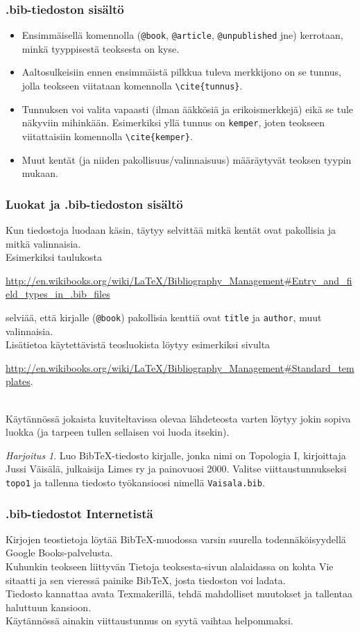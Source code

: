 \documentclass[handout]{beamer}
\theoremstyle{remark}
\newtheorem{harj}{Harjoitus}[section]
\newcommand{\vaihto}{\\ \vspace{10pt}}
\newcommand{\BibTeX}{BibTeX}
\begin{document}
\begin{frame}[fragile]
\frametitle{.bib-tiedoston sisältö}
\begin{itemize}
\item Ensimmäisellä komennolla (\verb-@book-, \verb-@article-, \verb-@unpublished- jne) kerrotaan, minkä tyyppisestä teoksesta on kyse. 
\item Aaltosulkeisiin ennen ensimmäistä pilkkua tuleva merkkijono on se tunnus, jolla teokseen viitataan komennolla \verb-\cite{tunnus}-. 
\item Tunnuksen voi valita vapaasti (ilman ääkkösiä ja erikoismerkkejä) eikä se tule näkyviin mihinkään.  Esimerkiksi yllä tunnus on \verb-kemper-, joten teokseen viitattaisiin komennolla \verb-\cite{kemper}-.
\item Muut kentät (ja niiden pakollisuus/valinnaisuus) määräytyvät teoksen tyypin mukaan.
\end{itemize}
\end{frame}
\begin{frame}[fragile]
\frametitle{Luokat ja .bib-tiedoston sisältö}
Kun tiedostoja luodaan käsin, täytyy selvittää mitkä kentät ovat pakollisia ja mitkä valinnaisia. 
\vaihto
Esimerkiksi taulukosta 
\begin{scriptsize}
\url{http://en.wikibooks.org/wiki/LaTeX/Bibliography_Management#Entry_and_field_types_in_.bib_files}
\end{scriptsize}
selviää, että kirjalle (\verb-@book-) pakollisia kenttiä ovat \verb-title- ja \verb-author-, muut valinnaisia.
\vaihto
Lisätietoa käytettävistä teosluokista löytyy esimerkiksi sivulta
\begin{scriptsize}
\url{http://en.wikibooks.org/wiki/LaTeX/Bibliography_Management#Standard_templates}.
\end{scriptsize}
\vaihto
Käytännössä jokaista kuviteltavissa olevaa lähdeteosta varten löytyy jokin sopiva luokka (ja tarpeen tullen sellaisen voi luoda itsekin).
\end{frame}
\begin{frame}[fragile]
\begin{harj}
Luo \BibTeX-tiedosto kirjalle, jonka nimi on Topologia I, kirjoittaja Jussi Väisälä, julkaisija Limes ry ja painovuosi 2000. Valitse viittaustunnukseksi \verb-topo1- ja tallenna tiedosto työkansioosi nimellä \verb-Vaisala.bib-.
\end{harj}
\end{frame}
\begin{frame}[fragile]
\frametitle{.bib-tiedostot Internetistä}
Kirjojen teostietoja löytää \BibTeX -muodossa varsin suurella todennäköisyydellä Google Books-palvelusta. 
\vaihto
Kuhunkin teokseen liittyvän Tietoja teoksesta-sivun alalaidassa on kohta Vie sitaatti ja sen vieressä painike \BibTeX, josta tiedoston voi ladata.
\vaihto
Tiedosto kannattaa avata Texmakerillä, tehdä mahdolliset muutokset ja tallentaa haluttuun kansioon. 
\vaihto
Käytännössä ainakin viittaustunnus on syytä vaihtaa helpommaksi.
\end{frame}
\end{document}

